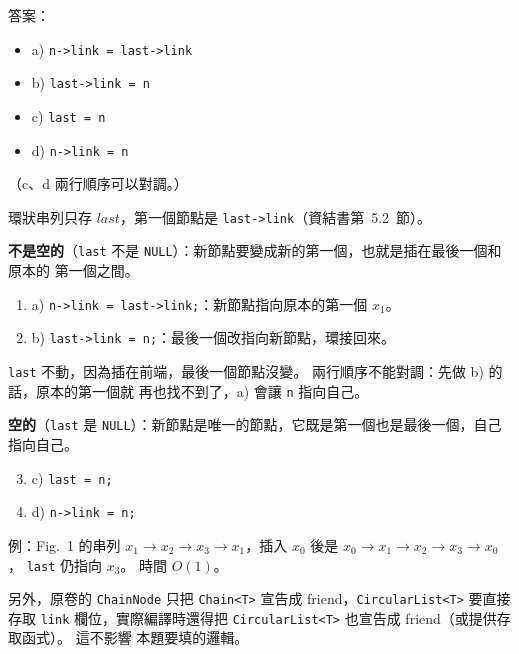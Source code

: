 \begin{pastsoln}
答案：
\begin{itemize}
\item a) \texttt{n->link = last->link}
\item b) \texttt{last->link = n}
\item c) \texttt{last = n}
\item d) \texttt{n->link = n}
\end{itemize}
（c、d 兩行順序可以對調。）

環狀串列只存 $\mathit{last}$，第一個節點是 \texttt{last->link}（資結書第~5.2~節）。

\textbf{不是空的}（\texttt{last} 不是 \texttt{NULL}）：新節點要變成新的第一個，也就是插在最後一個和原本的
第一個之間。
\begin{enumerate}
\item a) \texttt{n->link = last->link;}：新節點指向原本的第一個 $x_1$。
\item b) \texttt{last->link = n;}：最後一個改指向新節點，環接回來。
\end{enumerate}
\texttt{last} 不動，因為插在前端，最後一個節點沒變。 兩行順序不能對調：先做 b) 的話，原本的第一個就
再也找不到了，a) 會讓 \texttt{n} 指向自己。

\textbf{空的}（\texttt{last} 是 \texttt{NULL}）：新節點是唯一的節點，它既是第一個也是最後一個，自己指向自己。
\begin{enumerate}
\setcounter{enumi}{2}
\item c) \texttt{last = n;}
\item d) \texttt{n->link = n;}
\end{enumerate}

例：Fig.~1 的串列 $x_1 \to x_2 \to x_3 \to x_1$，插入 $x_0$ 後是 $x_0 \to x_1 \to x_2 \to x_3 \to x_0$，
\texttt{last} 仍指向 $x_3$。 時間 $O(1)$。

另外，原卷的 \texttt{ChainNode} 只把 \texttt{Chain<T>} 宣告成 friend，\texttt{CircularList<T>} 要直接存取
\texttt{link} 欄位，實際編譯時還得把 \texttt{CircularList<T>} 也宣告成 friend（或提供存取函式）。 這不影響
本題要填的邏輯。
\end{pastsoln}

